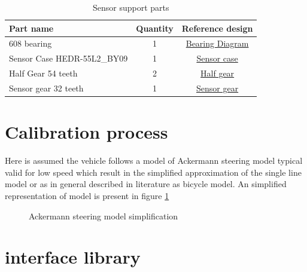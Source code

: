 \begin{table}[!hb]
    \centering
	\begin{tabular}{lcc}
		\toprule
		\textbf{Part name} & \textbf{Quantity} & \textbf{Reference design}\\
		\midrule
		608 bearing & 1 & \hyperref[draw:bearing]{Bearing Diagram}\\
		Sensor Case HEDR-55L2\_BY09 & 1 & \hyperref[draw:sensor-case]{Sensor case}\\
        Half Gear 54 teeth & 2 & \hyperref[draw:half-gear]{Half gear}\\
        Sensor gear 32 teeth & 1 & \hyperref[draw:sensor-gear]{Sensor gear}\\
		\bottomrule
	\end{tabular}
\caption{Sensor support parts}
\label{tab:sensor_support_parts}
\end{table}



\section{Calibration process}
Here is assumed the vehicle follows a model of Ackermann steering model typical valid for low speed which result in the simplified approximation of the single line model or as in general described in literature as bicycle model.\cite{Snider2009} \cite{Navigation_System_Design} An simplified representation of model is present in figure \ref{fig:ackermann_steering}
\begin{figure}[!hb]
	\centering
	\hfill
	\caption{Ackermann steering model simplification}
	\label{fig:ackermann_steering}
\end{figure}
\section{interface library}
\blindtext